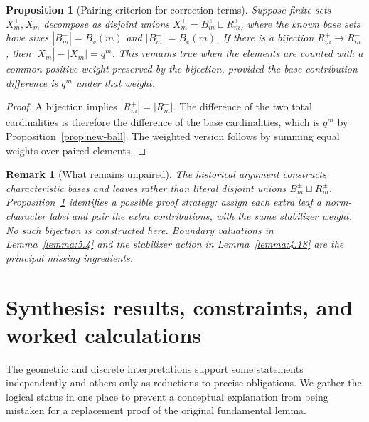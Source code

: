 \documentclass[12pt,letterpaper]{amsart}
\numberwithin{equation}{section}
\newtheorem{proposition}[theorem]{Proposition}
\newtheorem{draftremark}{Remark}
\theoremstyle{definition}
\theoremstyle{plain}
\begin{document}
\begin{proposition}[Pairing criterion for correction terms]
\label{prop:new-pair}
Suppose finite sets $X_m^+,X_m^-$ decompose as disjoint unions
$X_m^\pm=B_m^\pm\sqcup R_m^\pm$, where the known base sets
have sizes $|B_m^+|=B_v(m)$ and $|B_m^-|=B_e(m)$.
If there is a bijection $R_m^+\to R_m^-$, then
$|X_m^+|-|X_m^-|=q^m$. This remains true when the elements are
counted with a common positive weight preserved by the bijection,
provided the base contribution difference is $q^m$ under that weight.
\end{proposition}
\begin{proof}
A bijection implies $|R_m^+|=|R_m^-|$. The difference of
the two total cardinalities is therefore the difference of
the base cardinalities, which is $q^m$ by
Proposition~\ref{prop:new-ball}. The weighted version follows
by summing equal weights over paired elements.
\end{proof}

\begin{draftremark}[What remains unpaired]
The historical argument constructs characteristic bases and leaves
rather than literal disjoint unions $B_m^\pm\sqcup R_m^\pm$.
Proposition~\ref{prop:new-pair} identifies a possible proof
strategy: assign each extra leaf a norm-character label and pair
the extra contributions, with the same stabilizer weight. No such
bijection is constructed here. Boundary valuations in
Lemma~\ref{lemma:5.4} and the stabilizer action in
Lemma~\ref{lemma:4.18} are the principal missing ingredients.
\end{draftremark}

\section{Synthesis: results, constraints, and worked calculations}
\label{sec:new-synthesis}

The geometric and discrete interpretations support some statements
independently and others only as reductions to precise obligations.
We gather the logical status in one place to prevent a conceptual
explanation from being mistaken for a replacement proof of the
original fundamental lemma.
\end{document}
